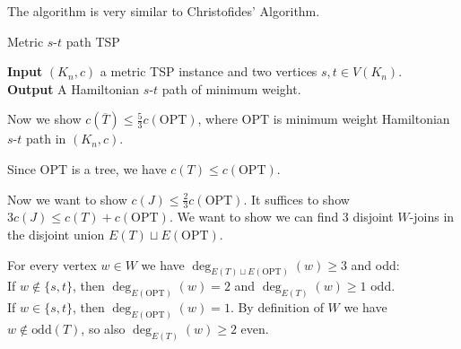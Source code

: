 \newcommand{\sheet}{8}




\maketitle

\begin{exercise}{1}
    The algorithm is very similar to Christofides' Algorithm.
    \begin{algorithm}
        \caption{Metric $s$-$t$ path TSP}
        \textbf{Input} $(K_n, c)$ a metric TSP instance and two vertices $s, t
        \in V(K_n)$. \\
        \textbf{Output} A Hamiltonian $s$-$t$ path of minimum weight.
        \begin{algorithmic}[1]
        \end{algorithmic}
    \end{algorithm}

    Now we show $c(\overline{T}) \leq \frac{5}{3} c(\text{OPT})$, where
    $\text{OPT}$ is minimum weight Hamiltonian $s$-$t$ path in $(K_n, c)$.

    Since $\text{OPT}$ is a tree, we have $c(T) \leq c(\text{OPT})$.

    Now we want to show $c(J) \leq \frac{2}{3} c(\text{OPT})$.
    It suffices to show $3 c(J) \leq c(T) + c(\text{OPT})$.
    We want to show we can find $3$ disjoint $W$-joins in the disjoint union
    $E(T) \sqcup E(\text{OPT})$.

    For every vertex $w \in W$ we have $\deg_{E(T) \sqcup
    E(\text{OPT})}(w) \geq 3$ and odd:\\
    If $w \notin \{s, t\}$, then $\deg_{E(\text{OPT})}(w) = 2$ and
    $\deg_{E(T)}(w) \geq 1$ odd.\\
    If $w \in \{s, t\}$, then $\deg_{E(\text{OPT})}(w) = 1$. By definition of
    $W$ we have $w \notin \text{odd}(T)$, so also $\deg_{E(T)}(w) \geq 2$ even.


\end{exercise}

